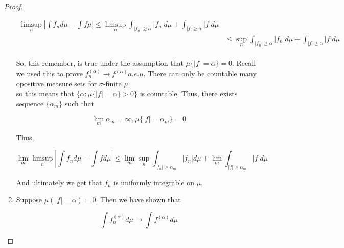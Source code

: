 \documentclass[11pt,fleqn]{book} %
\begin{document}
		
\begin{proof}
	
	\begin{enumerate}


		\begin{align*}
			 \limsup_{n} \left| \int f_n d\mu - \int f \mu \right| \leq \limsup_n \int_{|f_n| \geq \alpha} | f_n | d\mu + \int_{|f| \geq \alpha} |f| d\mu\\
			 	&\leq \sup_n \int_{|f_n| \geq \alpha} | f_n | d\mu + \int_{|f| \geq \alpha} |f| d\mu\\
		\end{align*}

		So, this remember, is true under the assumption that $\mu \{|f| = \alpha\} = 0$. Recall we used this to prove $f_n^{(\alpha)} \rightarrow f^{(\alpha)} a.e. \mu$. There can only be countable many opositive measure sets for $\sigma$-finite $\mu$.\\

		so this means that $\{\alpha: \mu \{|f| = \alpha \} > 0\}$ is countable. Thus, there exists sequence $\{\alpha_m\}$ such that 

				$$\lim_m \alpha_m = \infty, \mu\{|f| = \alpha_m\} = 0$$

		Thus, 

				$$\lim_m \limsup_n |\int f_n d\mu - \int f d\mu| \leq \lim_m \sup_n \int_{|f_n| \geq \alpha_m} |f_n| d\mu  + \lim_m \int_{|f| \geq \alpha_m} |f| d\mu$$ 

		And ultimately we get that $f_n$ is uniformly integrable on $\mu$.

		\item  Suppose $\mu(|f| = \alpha) = 0$. Then we have shown that 

				$$\int f_n^{(\alpha)} d\mu \rightarrow \int f^{(\alpha)} d\mu $$


\end{enumerate}
\end{proof}
\end{document}
